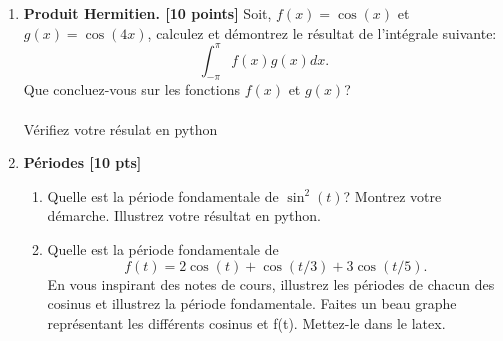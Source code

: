 \documentclass{article}
\begin{document}
\begin{enumerate}

\item {\bf Produit Hermitien. [10 points]} Soit, 
  $f(x) = \cos(x)$ et $g(x) = \cos(4x)$,
  calculez et démontrez le résultat de l'intégrale suivante: 
  $$
  \int_{-\pi}^{\pi} f(x) g(x) dx.
  $$
  Que concluez-vous sur les fonctions $f(x)$ et $g(x)$?
  \\
  \\
  Vérifiez votre résulat en python
\vspace{1cm}


\item  {\bf Périodes [10 pts]}
  \begin{enumerate}
    \vspace{0.5cm}
  \item Quelle est la période fondamentale de $\sin^2(t)$? Montrez votre
    démarche. Illustrez votre résultat en python.
    \vspace{1cm}    
  \item Quelle est la période fondamentale de 
    $$
    f(t) = 2\cos(t) +    \cos(t/3) + 3\cos(t/5).  
    $$
    En vous inspirant des notes de cours, illustrez
    les périodes de chacun des cosinus et illustrez la période
    fondamentale. Faites un beau graphe représentant les différents
    cosinus et f(t). Mettez-le dans le latex.

\end{enumerate}

\newpage 


\end{enumerate}
\end{document}
